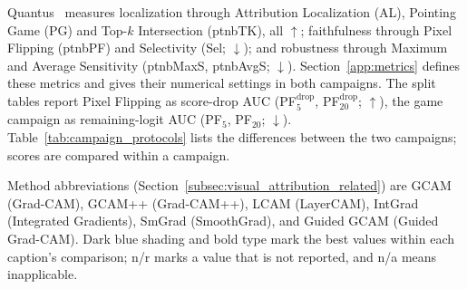 Quantus~\parencite{Hedstrom2023} measures localization through Attribution Localization (AL), Pointing Game (PG) and Top-$k$ Intersection (\acs{ptnbTK}), all $\uparrow$; faithfulness through Pixel Flipping (\acs{ptnbPF}) and Selectivity (Sel; $\downarrow$); and robustness through Maximum and Average Sensitivity (\acs{ptnbMaxS}, \acs{ptnbAvgS}; $\downarrow$). Section~\ref{app:metrics} defines these metrics and gives their numerical settings in both campaigns. The split tables report Pixel Flipping as score-drop AUC (PF$^{\mathrm{drop}}_5$, PF$^{\mathrm{drop}}_{20}$; $\uparrow$), the game campaign as remaining-logit AUC (PF$_5$, PF$_{20}$; $\downarrow$). Table~\ref{tab:campaign_protocols} lists the differences between the two campaigns; scores are compared within a campaign.

\begin{table}[htbp]
%
\caption[Protocols of the two evaluation campaigns]{Protocols of the split-method and game-method campaigns on ImageNet-S. The Transformer \acs{dc} extension of Section~\ref{sec:vit-extension} follows the game campaign's ViT-B/16 protocol.}
\label{tab:campaign_protocols}
\end{table}

Method abbreviations (Section~\ref{subsec:visual_attribution_related}) are GCAM (Grad-CAM), GCAM++ (Grad-CAM++), LCAM (LayerCAM), IntGrad (Integrated Gradients), SmGrad (SmoothGrad), and Guided GCAM (Guided Grad-CAM). Dark blue shading and bold type mark the best values within each caption's comparison; n/r marks a value that is not reported, and n/a means inapplicable.

